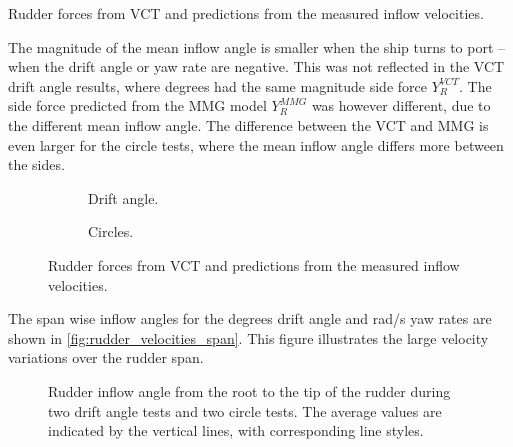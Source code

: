 \begin{table}[h]
    \centering
    \caption{Rudder forces from VCT and predictions from the measured inflow velocities.}
    \label{tab:inflow_to_rudder_force}
\end{table}
The magnitude of the mean inflow angle is smaller when the ship turns to port -- when the drift angle or yaw rate are negative. This was not reflected in the VCT drift angle results, where  degrees had the same magnitude side force $Y_R^{VCT}$. The side force predicted from the MMG model $Y_R^{MMG}$ was however different, due to the different mean inflow angle. The difference between the VCT and MMG is even larger for the circle tests, where the mean inflow angle differs more between the sides.  
\begin{figure}[h]
     \centering
     \begin{subfigure}[b]{\textwidth}
         \centering
         
        \caption{Drift angle.}
        \label{fig:inflow_to_force_drift_angle}
     \end{subfigure}
     \vfill
     \begin{subfigure}[b]{\textwidth}
         
        \caption{Circles.}
        \label{fig:inflow_to_force_circle}
     \end{subfigure}
        \caption{Rudder forces from VCT and predictions from the measured inflow velocities.}
        \label{fig:inflow_to_rudder_force}
\end{figure}

The span wise inflow angles for the  degrees drift angle and  rad/s yaw rates are shown in \autoref{fig:rudder_velocities_span}. This figure illustrates the large velocity variations over the rudder span.
\begin{figure}[h]
    \centering 
    
    \caption{Rudder inflow angle from the root to the tip of the rudder during two drift angle tests and two circle tests. The average values are indicated by the vertical lines, with corresponding line styles.}
     \label{fig:rudder_velocities_span}
\end{figure}
